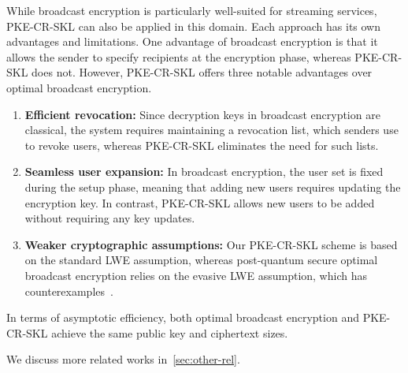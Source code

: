 While broadcast encryption is particularly well-suited for streaming services, PKE-CR-SKL can also be applied in this domain. Each approach has its own advantages and limitations. One advantage of broadcast encryption is that it allows the sender to specify recipients at the encryption phase, whereas PKE-CR-SKL does not.
However, PKE-CR-SKL offers three notable advantages over optimal broadcast encryption.
\begin{enumerate}
    \item \textbf{Efficient revocation:} Since decryption keys in broadcast encryption are classical, the system requires maintaining a revocation list, which senders use to revoke users, whereas PKE-CR-SKL eliminates the need for such lists.
    \item \textbf{Seamless user expansion:} In broadcast encryption, the user set is fixed during the setup phase, meaning that adding new users requires updating the encryption key. In contrast, PKE-CR-SKL allows new users to be added without requiring any key updates.
    \item \textbf{Weaker cryptographic assumptions:} Our PKE-CR-SKL scheme is based on the standard LWE assumption, whereas post-quantum secure optimal broadcast encryption relies on the evasive LWE assumption, which has counterexamples~\cite{AC:BrzUnaWoo24}.
\end{enumerate}
In terms of  asymptotic efficiency, both optimal broadcast encryption and PKE-CR-SKL achieve the same public key and ciphertext sizes.

\ifnum{}
We discuss more related works in~\cref{sec:other-rel}.
\else

\fi





